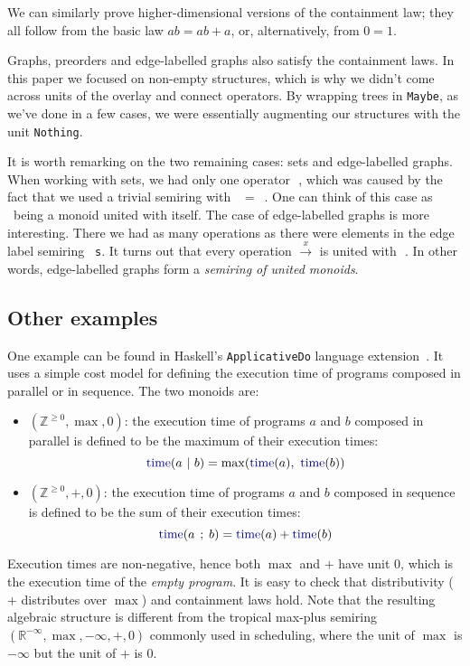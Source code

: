 \documentclass[english,submission]{programming}
\newcommand{\code}[1]{\lstinline[mathescape]|#1|}
\newcommand{\hcode}[1]{{\color{darkblue} \lstinline[keywordstyle={}]|#1|}} %
\newcommand{\hdia}{\,\text{\raisebox{-0.2mm}{\Large\color{darkblue} $\diamond$}}\,}
\newcommand{\zero}{\raisebox{-0.2mm}{\textcircled{0}}\xspace}
\newcommand{\one}{\raisebox{-0.2mm}{\textcircled{1}}\xspace}
\begin{document}
\noindent
We can similarly prove higher-dimensional versions of the containment law; they
all follow from the basic law $\textit{ab} = \textit{ab} + a$, or,
alternatively, from $0 = 1$.

Graphs, preorders and edge-labelled graphs also satisfy the containment laws.
In this paper we focused on non-empty structures, which is why we didn't come
across units of the overlay and connect operators. By wrapping trees in
\hcode{Maybe}, as we've done in a few cases, we were essentially augmenting our
structures with the unit \hcode{Nothing}.

It is worth remarking on the two remaining cases: sets and edge-labelled graphs.
When working with sets, we had only one operator \hdia, which was caused by the
fact that we used a trivial semiring with \zero~$=$~\one. One can think of this
case as \hdia~being a monoid united with itself. The case of edge-labelled
graphs is more interesting. There we had as many operations as there were
elements in the edge label semiring~\hcode{s}. It turns out that every operation
$\xrightarrow{x}$ is united with \hdia. In other words, edge-labelled graphs
form a \emph{semiring of united monoids}.

\subsection{Other examples}

One example can be found in Haskell's \code{ApplicativeDo} language
extension~\cite{applicativedo}. It uses a simple cost model for defining the
execution time of programs composed in parallel or in sequence. The two monoids
are:

\begin{itemize}
    \item $(\mathbb{Z}^{\ge 0}, \max, 0)$: the execution time of programs $a$
    and $b$ composed in parallel is defined to be the maximum of their execution
    times:
    \[
    \text{\hcode{time}}(a\ \text{\code{|}}\ b) = \max(\text{\hcode{time}}(a),\ \text{\hcode{time}}(b))
    \]

    \item $(\mathbb{Z}^{\ge 0}, +, 0)$: the execution time of programs $a$ and
    $b$ composed in sequence is defined to be the sum of their execution times:
    \[
    \text{\hcode{time}}(a\ \text{\code{;}}\ b) = \text{\hcode{time}}(a) + \text{\hcode{time}}(b)
    \]
\end{itemize}

\noindent
Execution times are non-negative, hence both $\max$ and $+$ have unit $0$,
which is the execution time of the \emph{empty program}. It is easy to check
that distributivity ($+$ distributes over $\max$) and containment laws hold.
Note that the resulting algebraic structure is different from the tropical
max-plus semiring $(\mathbb{R}^{-\infty}, \max, -\infty, +, 0)$ commonly used in
scheduling, where the unit of $\max$ is $-\infty$ but the unit of $+$ is $0$.
\end{document}

